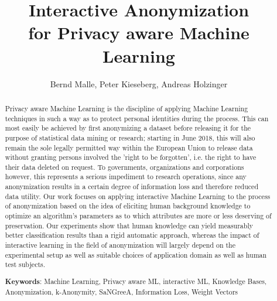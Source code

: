 \documentclass{llncs}
\begin{document}
\title{Interactive Anonymization\\
for Privacy aware Machine Learning}

\author{Bernd Malle, Peter Kieseberg, Andreas Holzinger}

	
\maketitle

\begin{abstract}

Privacy aware Machine Learning is the discipline of applying Machine Learning techniques in such a way as to protect personal identities during the process. This can most easily be achieved by first anonymizing a dataset before releasing it for the purpose of statistical data mining or research; starting in June 2018, this will also remain the sole legally permitted way within the European Union to release data without granting persons involved the 'right to be forgotten', i.e. the right to have their data deleted on request. To governments, organizations and corporations however, this represents a serious impediment to research operations, since any anonymization results in a certain degree of information loss and therefore reduced data utility. Our work focuses on applying interactive Machine Learning to the process of anonymization based on the idea of eliciting human background knowledge to optimize an algorithm's parameters as to which attributes are more or less deserving of preservation. Our experiments show that human knowledge can yield measurably better classification results than a rigid automatic approach, whereas the impact of interactive learning in the field of anonymization will largely depend on the experimental setup as well as suitable choices of application domain as well as human test subjects.


\medskip

\textbf{Keywords}: Machine Learning, Privacy aware ML, interactive ML, Knowledge Bases, Anonymization, k-Anonymity, SaNGreeA, Information Loss, Weight Vectors


\end{abstract}
\end{document}
